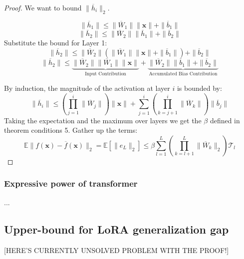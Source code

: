 \documentclass{article}
\begin{document}
\begin{proof}
                        We want to bound $\| \overline{h}_i \|_2$.

                            $$ \| \overline{h}_1 \| \leqslant \| \overline{W}_1 \| \| \mathbf{x} \| + \| \overline{b}_1 \| $$
                            $$ \| \overline{h}_2 \| \leqslant \| \overline{W}_2 \| \| \overline{h}_1 \| + \| \overline{b}_2 \| $$
                            Substitute the bound for Layer 1:
                            $$ \| \overline{h}_2 \| \leqslant \| \overline{W}_2 \| ( \| \overline{W}_1 \| \| \mathbf{x} \| + \| \overline{b}_1 \| ) + \| \overline{b}_2 \| $$
                            $$ \| \overline{h}_2 \| \leqslant \underbrace{\| \overline{W}_2 \| \| \overline{W}_1 \| \| \mathbf{x} \|}_{\text{Input Contribution}} + \underbrace{\| \overline{W}_2 \| \| \overline{b}_1 \| + \| \overline{b}_2 \|}_{\text{Accumulated Bias Contribution}} $$
                        
                            By induction, the magnitude of the activation at layer $i$ is bounded by:
                            $$ \| \overline{h}_i \| \leqslant \left( \prod_{j=1}^i \| \overline{W}_j \| \right) \| \mathbf{x} \| + \sum_{j=1}^i \left( \prod_{k=j+1}^i \| \overline{W}_k \| \right) \| \overline{b}_j \| $$
                            Taking the expectation and the maximum over layers we get the $\beta$ defined in theorem conditions
                    5.  Gather up the terms:
                        $$ \mathbb{E} \| f(\mathbf{x}) - \overline{f}(\mathbf{x}) \|_2 = \mathbb{E}[\|e_L\|_2] \leqslant  \beta \sum_{l=1}^L \left( \prod_{k=l+1}^L \| \overline{W}_k \|_2 \right) \mathcal{T}_l $$

                    \end{proof}


            \subsubsection{Expressive power of transformer}
                ...


        


        

        \vspace{3cm}
        \subsection{Upper-bound for LoRA generalization gap}
           [HERE'S CURRENTLY UNSOLVED PROBLEM WITH THE PROOF!]
\end{document}
